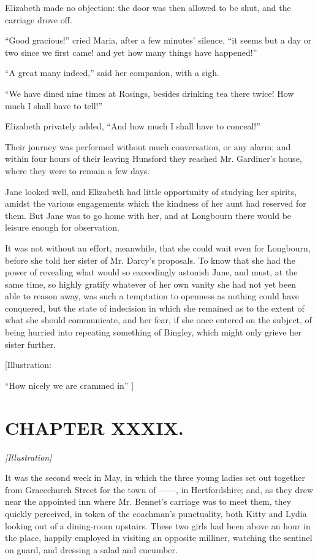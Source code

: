 \documentclass[12pt]{book}
\begin{document}
Elizabeth made no objection: the door was then allowed to be shut, and the carriage drove off.

``Good gracious!'' cried Maria, after a few minutes' silence, ``it seems but a day or two since we first came! and yet how many things have happened!''

``A great many indeed,'' said her companion, with a sigh.

``We have dined nine times at Rosings, besides drinking tea there twice! How much I shall have to tell!''

Elizabeth privately added, ``And how much I shall have to conceal!''

Their journey was performed without much conversation, or any alarm; and within four hours of their leaving Hunsford they reached Mr. Gardiner's house, where they were to remain a few days.

Jane looked well, and Elizabeth had little opportunity of studying her spirits, amidst the various engagements which the kindness of her aunt had reserved for them. But Jane was to go home with her, and at Longbourn there would be leisure enough for observation.

It was not without an effort, meanwhile, that she could wait even for Longbourn, before she told her sister of Mr. Darcy's proposals. To know that she had the power of revealing what would so exceedingly astonish Jane, and must, at the same time, so highly gratify whatever of her own vanity she had not yet been able to reason away, was such a temptation to openness as nothing could have conquered, but the state of indecision in which she remained as to the extent of what she should communicate, and her fear, if she once entered on the subject, of being hurried into repeating something of Bingley, which might only grieve her sister further.

[Illustration:

``How nicely we are crammed in'' ]

\chapter{CHAPTER XXXIX.}

\emph{[Illustration]}

It was the second week in May, in which the three young ladies set out together from Gracechurch Street for the town of ------, in Hertfordshire; and, as they drew near the appointed inn where Mr. Bennet's carriage was to meet them, they quickly perceived, in token of the coachman's punctuality, both Kitty and Lydia looking out of a dining-room upstairs. These two girls had been above an hour in the place, happily employed in visiting an opposite milliner, watching the sentinel on guard, and dressing a salad and cucumber.
\end{document}
